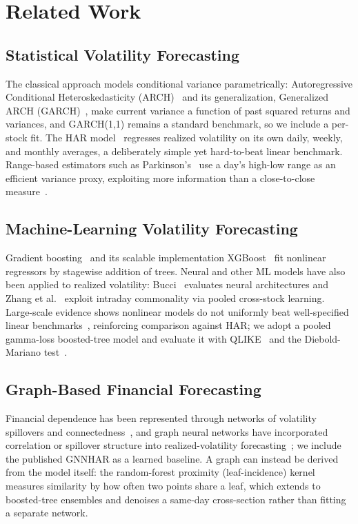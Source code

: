 \documentclass[runningheads,a4paper]{llncs}
\begin{document}
\section{Related Work}

\subsection{Statistical Volatility Forecasting}
The classical approach models conditional variance parametrically: Autoregressive Conditional Heteroskedasticity (ARCH)~\cite{engle1982} and its
generalization, Generalized ARCH (GARCH)~\cite{bollerslev1986}, make current variance a function of past squared returns and
variances, and GARCH(1,1) remains a standard benchmark, so we include a per-stock fit. The HAR
model~\cite{corsi2009} regresses realized volatility on its own daily, weekly, and monthly averages, a
deliberately simple yet hard-to-beat linear benchmark. Range-based estimators such as
Parkinson's~\cite{parkinson1980} use a day's high-low range as an efficient variance proxy, exploiting
more information than a close-to-close measure~\cite{alizadeh2002}.

\subsection{Machine-Learning Volatility Forecasting}
Gradient boosting~\cite{friedman2001} and its scalable implementation XGBoost~\cite{chen2016} fit
nonlinear regressors by stagewise addition of trees. Neural and other ML models have also been applied to
realized volatility: Bucci~\cite{bucci2020} evaluates neural architectures and Zhang et
al.~\cite{zhang2024ml} exploit intraday commonality via pooled cross-stock learning. Large-scale evidence
shows nonlinear models do not uniformly beat well-specified linear benchmarks~\cite{branco2024},
reinforcing comparison against HAR; we adopt a pooled gamma-loss boosted-tree model and evaluate it with
QLIKE~\cite{patton2011} and the Diebold-Mariano test~\cite{dm1995,hln1997}.

\subsection{Graph-Based Financial Forecasting}
Financial dependence has been represented through networks of volatility spillovers and connectedness~\cite{diebold2014},
and graph neural networks have incorporated correlation or spillover structure into realized-volatility
forecasting~\cite{gnnhar2024}; we include the published GNNHAR as a learned baseline. A graph can instead
be derived from the model itself: the random-forest proximity (leaf-incidence) kernel~\cite{rhodes2023}
measures similarity by how often two points share a leaf, which extends to boosted-tree ensembles and
denoises a same-day cross-section rather than fitting a separate network.
\end{document}
